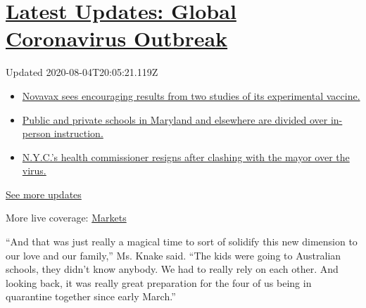 \hypertarget{latest-updates-global-coronavirus-outbreak}{%
\section{\texorpdfstring{\href{https://www.nytimes.com/2020/08/04/world/coronavirus-cases.html?action=click\&pgtype=Article\&state=default\&region=MAIN_CONTENT_1\&context=storylines_live_updates}{Latest
Updates: Global Coronavirus
Outbreak}}{Latest Updates: Global Coronavirus Outbreak}}\label{latest-updates-global-coronavirus-outbreak}}

Updated 2020-08-04T20:05:21.119Z

\begin{itemize}
\tightlist
\item
  \href{https://www.nytimes.com/2020/08/04/world/coronavirus-cases.html?action=click\&pgtype=Article\&state=default\&region=MAIN_CONTENT_1\&context=storylines_live_updates\#link-1228a480}{Novavax
  sees encouraging results from two studies of its experimental
  vaccine.}
\item
  \href{https://www.nytimes.com/2020/08/04/world/coronavirus-cases.html?action=click\&pgtype=Article\&state=default\&region=MAIN_CONTENT_1\&context=storylines_live_updates\#link-4825b93}{Public
  and private schools in Maryland and elsewhere are divided over
  in-person instruction.}
\item
  \href{https://www.nytimes.com/2020/08/04/world/coronavirus-cases.html?action=click\&pgtype=Article\&state=default\&region=MAIN_CONTENT_1\&context=storylines_live_updates\#link-4d1eafa8}{N.Y.C.'s
  health commissioner resigns after clashing with the mayor over the
  virus.}
\end{itemize}

\href{https://www.nytimes.com/2020/08/04/world/coronavirus-cases.html?action=click\&pgtype=Article\&state=default\&region=MAIN_CONTENT_1\&context=storylines_live_updates}{See
more updates}

More live coverage:
\href{https://www.nytimes.com/live/2020/08/04/business/stock-market-today-coronavirus?action=click\&pgtype=Article\&state=default\&region=MAIN_CONTENT_1\&context=storylines_live_updates}{Markets}

``And that was just really a magical time to sort of solidify this new
dimension to our love and our family,'' Ms. Knake said. ``The kids were
going to Australian schools, they didn't know anybody. We had to really
rely on each other. And looking back, it was really great preparation
for the four of us being in quarantine together since early March.''

